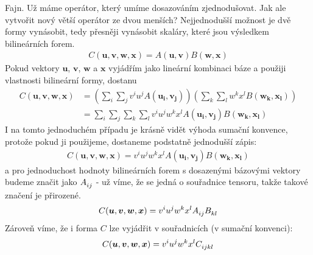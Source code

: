 \documentclass[a5paper,12pt]{amsbook}
\theoremstyle{definition}
\newcommand{\myvec}[1]{\bm{#1}}
\begin{document}
Fajn. Už máme operátor, který umíme dosazováním zjednodušovat. Jak ale vytvořit nový
větší operátor ze dvou menších? Nejjednodušší možnost je dvě formy vynásobit,
tedy přesněji vynásobit skaláry, které jsou výsledkem bilineárních forem.
\begin{equation*}
\begin{split}
C(\myvec{u}, \myvec{v}, \myvec{w}, \myvec{x}) = A(\myvec{u}, \myvec{v})B(\myvec{w}, \myvec{x})
\end{split}
\end{equation*}
Pokud vektory $\myvec{u}$, $\myvec{v}$, $\myvec{w}$ a $\myvec{x}$ vyjádřím
jako lineární kombinaci báze a použiji vlastnosti bilineární formy, dostanu
\begin{equation*}
\begin{split}
C(\myvec{u}, \myvec{v}, \myvec{w}, \myvec{x}) &= 
  \left(\sum_{i}\sum_{j}v^i u^j A(\myvec{u_i}, \myvec{v_j})\right)
  \left(\sum_{k}\sum_{l}w^k x^l B(\myvec{w_k}, \myvec{x_l})\right) \\
&= \sum_{i}\sum_{j}\sum_{k}\sum_{l} v^i u^j w^k x^l 
  A(\myvec{u_i}, \myvec{v_j}) B(\myvec{w_k}, \myvec{x_l})
\end{split}
\end{equation*}
I na tomto jednoduchém případu je krásně vidět výhoda sumační konvence,
protože pokud ji použijeme, dostaneme podstatně jednodušší zápis:
\begin{equation*}
\begin{split}
C(\myvec{u}, \myvec{v}, \myvec{w}, \myvec{x})
= v^i u^j w^k x^l A(\myvec{u_i}, \myvec{v_j}) B(\myvec{w_k}, \myvec{x_l})
\end{split}
\end{equation*}
a pro jednoduchost hodnoty bilineárních forem s dosazenými bázovými vektory
budeme značit jako $A\indices{_i_j}$ - už víme, že se jedná o souřadnice
tensoru, takže takové značení je přirozené. 
\begin{equation*}
\begin{split}
C(\myvec{u}, \myvec{v}, \myvec{w}, \myvec{x}) = v^i u^j w^k x^l A\indices{_i_j} B\indices{_k_l}
\end{split}
\end{equation*}
Zároveň víme, že i forma $C$ lze vyjádřit v souřadnicích (v sumační konvenci):
\begin{equation*}
\begin{split}
C(\myvec{u}, \myvec{v}, \myvec{w}, \myvec{x}) = v^i u^j w^k x^l C\indices{_i_j_k_l}
\end{split}
\end{equation*}
\end{document}
